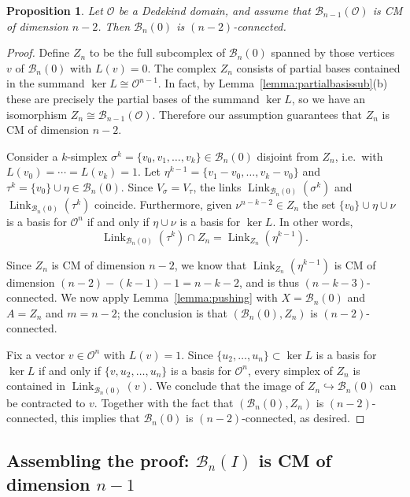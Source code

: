 \documentclass[11 pt]{article}
\theoremstyle{plain}
\newtheorem{proposition}[theorem]{Proposition}
\theoremstyle{definition}
\numberwithin{equation}{section}
\renewcommand{\O}{\mathcal{O}}
\newcommand\PartialBases{\ensuremath{\mathcal{B}}}
\newcommand{\PB}{\PartialBases}
\DeclareMathOperator{\Link}{Link}
\newcommand\into{\hookrightarrow}
\newcommand\iso{\cong}
\begin{document}
\begin{proposition}
\label{prop:B0connected}
Let $\O$ be a Dedekind domain, and assume that $\PB_{n-1}(\O)$ is CM of dimension $n-2$. Then $\PB_n(0)$ is $(n-2)$-connected.
\end{proposition}
\begin{proof}
Define $Z_n$ to be the full subcomplex of $\PartialBases_n(0)$ spanned by those vertices $v$ of $\PartialBases_n(0)$ with $L(v)=0$. The complex $Z_n$ consists of partial bases contained in the summand $\ker L\iso \O^{n-1}$.  In fact, by Lemma~\ref{lemma:partialbasissub}(b) these are precisely the partial bases of the summand $\ker L$, so we have an isomorphism $Z_n\iso \PB_{n-1}(\O)$. Therefore our assumption guarantees that $Z_n$ is CM of dimension $n-2$.

Consider a $k$-simplex $\sigma^k=\{v_0,v_1,\ldots,v_k\}\in \PartialBases_n(0)$ disjoint from $Z_n$, i.e.\ with $L(v_0)=\cdots=L(v_k)=1$. Let $\eta^{k-1}=\{v_1-v_0,\ldots,v_k-v_0\}$ and $\tau^k = \{v_0\}\cup \eta\in \PartialBases_n(0)$. Since $V_\sigma=V_\tau$, the links $\Link_{\PartialBases_n(0)}(\sigma^k)$ and $\Link_{\PartialBases_n(0)}(\tau^k)$ coincide.  Furthermore, given $\nu^{n-k-2}\in Z_n$ the set $\{v_0\}\cup \eta\cup\nu$ is a basis for $\O^n$ if and only if $\eta\cup\nu$ is a basis for $\ker L$. In other words,
\[\Link_{\PartialBases_n(0)}(\tau^k) \cap Z_n=\Link_{Z_n}(\eta^{k-1}).\]
 
Since $Z_n$ is CM of dimension $n-2$, we know that $\Link_{Z_n}(\eta^{k-1})$ is CM of dimension $(n-2)-(k-1)-1=n-k-2$, and is thus $(n-k-3)$-connected.
We now apply Lemma~\ref{lemma:pushing} with $X=\PartialBases_n(0)$ and $A=Z_n$ and $m=n-2$; the conclusion is
that $(\PB_n(0),Z_n)$ is $(n-2)$-connected.

Fix a vector $v\in \O^n$ with $L(v)=1$.  Since $\{u_2,\ldots,u_n\}\subset \ker L$ is a basis for $\ker L$ if and only if $\{v,u_2,\ldots,u_n\}$ is a basis for $\O^n$, every simplex of $Z_n$ is contained in $\Link_{\PB_n(0)}(v)$.
We conclude that the image of $Z_n\into \PB_n(0)$ 
can be contracted to $v$.  Together with the fact that $(\PB_n(0),Z_n)$ is $(n-2)$-connected, this
implies that $\PB_n(0)$ is $(n-2)$-connected, as desired.
\end{proof}

\subsection{Assembling the proof: \texorpdfstring{$\PB_n(I)$}{Bn(I)} is CM of dimension \texorpdfstring{$n-1$}{n-1}}
\label{section:BnICM}
\end{document}
